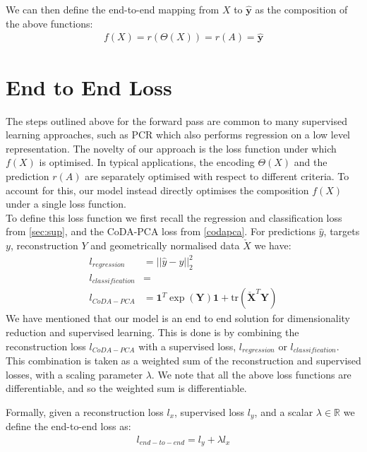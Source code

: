 
We can then define the end-to-end mapping from $X$ to $\mathbf{\hat{y}}$ as the composition of the above functions:
\begin{align}
\label{forwardpass}
    f(X) = r(\Theta(X)) = r(A) = \mathbf{\hat{y}}
\end{align}

\section{End to End Loss}
\label{endloss}
The steps outlined above for the forward pass are common to many supervised learning approaches, such as PCR which also performs regression on a low level representation. The novelty of our approach is the loss function under which $f(X)$ is optimised. In typical applications, the encoding $\Theta(X)$ and the prediction $r(A)$ are separately optimised with respect to different criteria. To account for this, our model instead directly optimises the composition $f(X)$ under a single loss function. \\
To define this loss function we first recall the regression and classification loss from \ref{sec:sup}, and the CoDA-PCA loss from \ref{codapca}. For predictions $\hat{y}$, targets $y$, reconstruction $Y$ and geometrically normalised data $\check{X}$ we have: 
\begin{align}
    l_{regression} &= ||\hat{y} - y ||^2_2 \\
    l_{classification} &= %
    \\
    l_{CoDA-PCA} &=   \mathbf{1}^T\exp{(\mathbf{Y})}\mathbf{1} + \text{tr}(\check{\mathbf{X}}^T\mathbf{Y})
\end{align}
We have mentioned that our model is an end to end solution for dimensionality reduction and supervised learning. This is done is by combining the reconstruction loss $l_{CoDA-PCA}$ with a supervised loss, $l_{regression}$ or $l_{classification}$. This combination is taken as a weighted sum of the reconstruction and supervised losses, with a scaling parameter $\lambda$. We note that all the above loss functions are differentiable, and so the weighted sum is differentiable.

Formally, given a reconstruction loss $l_{x}$, supervised loss $l_{y}$, and a scalar $\lambda \in \mathbb{R}$ we define the end-to-end loss as:  
\begin{align}
    l_{end-to-end} = l_{y} + \lambda l_{x}
\end{align}

